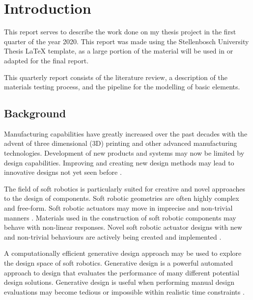 \chapter{Introduction}
\label{chp:Intro}

This report serves to describe the work done on my thesis project in the first quarter of the year 2020. This report was made using the Stellenbosch University Thesis LaTeX template, as a large portion of the material will be used in or adapted for the final report.

This quarterly report consists of the literature review, a description of the materials testing process, and the pipeline for the modelling of basic elements.

\section{Background}

Manufacturing capabilities have greatly increased over the past decades with the advent of three dimensional (3D) printing and other advanced manufacturing technologies. Development of new products and systems may now be limited by design capabilities. Improving and creating new design methods may lead to innovative designs not yet seen before \cite{Shea2005}.

The field of soft robotics is particularly suited for creative and novel approaches to the design of components. Soft robotic geometries are often highly complex and free-form. Soft robotic actuators may move in imprecise and non-trivial manners \cite{Whitesides2018}. Materials used in the construction of soft robotic components may behave with non-linear responses\cite{Boyraz2018}. Novel soft robotic actuator designs with new and non-trivial behaviours are actively being created and implemented \cite{Ellis2020}.

A computationally efficient generative design approach may be used to explore the design space of soft robotics. Generative design is a powerful automated approach to design that evaluates the performance of many different potential design solutions. Generative design is useful when performing manual design evaluations may become tedious or impossible within realistic time constraints \citep{Brose1993}.